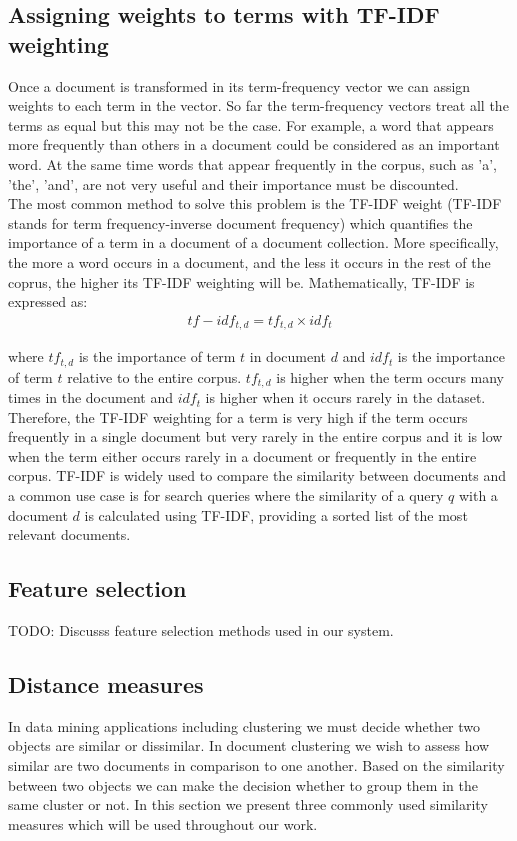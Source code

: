 \subsection{Assigning weights to terms with TF-IDF weighting}
Once a document is transformed in its term-frequency vector we can assign weights to each term in the vector. So far the term-frequency vectors treat 
all the terms as equal but this may not be the case. For example, a word that appears more frequently than others in a document could be considered as an 
important word. At the same time words that appear frequently in the corpus, such as 'a', 'the', 'and', are not very useful and their 
importance must be discounted. \\
The most common method to solve this problem is the TF-IDF weight (TF-IDF stands for term frequency-inverse document frequency) which quantifies the importance of a term in a document of a document collection. More specifically, the more a word occurs in a document, and the less it occurs in the rest of the coprus, the higher its TF-IDF weighting 
will be. Mathematically, TF-IDF is expressed as:\\
\begin{eqnarray}
tf-idf_{t,d} = tf_{t, d} \times idf_t
\end{eqnarray}

where $tf_{t, d}$ is the importance of term $t$ in document $d$ and $idf_t$ is the importance of term $t$ relative to the entire corpus. $tf_{t,d}$ is higher when the term occurs many times in the document and $idf_t$ is higher when it occurs rarely in the dataset. Therefore, the TF-IDF weighting for a term is very high if the term occurs frequently in a single document but very rarely in the entire corpus and it is low when the term either occurs rarely in a document or frequently in the entire corpus. TF-IDF is widely used to compare the similarity between documents and a common use case is for search queries where the similarity of a query $q$ with a document $d$ is calculated using TF-IDF, providing
a sorted list of the most relevant documents. 
\\
   
\subsection{Feature selection}
TODO: Discusss feature selection methods used in our system.

\subsection{Distance measures}
In data mining applications including clustering we must decide whether two objects are similar or dissimilar. In document clustering we wish to 
assess how similar are two documents in comparison to one another. Based on the similarity between two objects we can make the decision whether to
group them in the same cluster or not. In this section we present three commonly used similarity measures which will be used throughout our work. 

